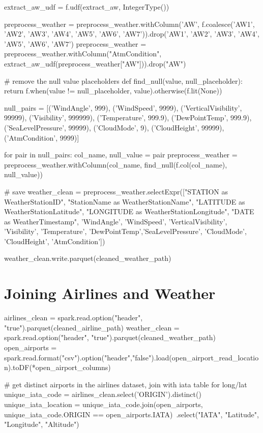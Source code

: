 \documentclass[11pt]{article}
\begin{document}
extract_aw_udf = f.udf(extract_aw, IntegerType())

preprocess_weather = preprocess_weather.withColumn('AW', f.coalesce('AW1', 'AW2', 'AW3', 'AW4', 'AW5', 'AW6', 'AW7')).drop('AW1', 'AW2', 'AW3', 'AW4', 'AW5', 'AW6', 'AW7')
preprocess_weather = preprocess_weather.withColumn("AtmCondition", extract_aw_udf(preprocess_weather["AW"])).drop("AW")

# remove the null value placeholders
def find_null(value, null_placeholder):
    return f.when(value != null_placeholder, value).otherwise(f.lit(None))

null_pairs = [('WindAngle', 999), ('WindSpeed', 9999), ('VerticalVisibility', 99999),
              ('Visibility', 999999), ('Temperature', 999.9), ('DewPointTemp', 999.9),
              ('SeaLevelPressure', 99999), ('CloudMode', 9), ('CloudHeight', 99999),
              ('AtmCondition', 9999)]

for pair in null_pairs:
    col_name, null_value = pair
    preprocess_weather = preprocess_weather.withColumn(col_name, find_null(f.col(col_name), null_value))

# save
weather_clean = preprocess_weather.selectExpr(["STATION as WeatherStationID", "StationName as WeatherStationName", 
    "LATITUDE as WeatherStationLatitude", "LONGITUDE as WeatherStationLongitude", "DATE as WeatherTimestamp", 
    'WindAngle', 'WindSpeed', 'VerticalVisibility', 'Visibility', 'Temperature', 
    'DewPointTemp','SeaLevelPressure', 'CloudMode', 'CloudHeight', 'AtmCondition'])

weather_clean.write.parquet(cleaned_weather_path)
    \hypertarget{joining-airlines-and-weather}{%
\section{Joining Airlines and
Weather}\label{joining-airlines-and-weather}}

airlines_clean = spark.read.option("header", "true").parquet(cleaned_airline_path)
weather_clean = spark.read.option("header", "true").parquet(cleaned_weather_path)
open_airports = spark.read.format("csv").option("header","false").load(open_airport_read_location).toDF(*open_airport_columns)

# get distinct airports in the airlines dataset, join with iata table for long/lat
unique_iata_code = airlines_clean.select('ORIGIN').distinct()
unique_iata_location = unique_iata_code.join(open_airports, unique_iata_code.ORIGIN == open_airports.IATA)\
                      .select("IATA", "Latitude", "Longitude", "Altitude")
\end{document}
